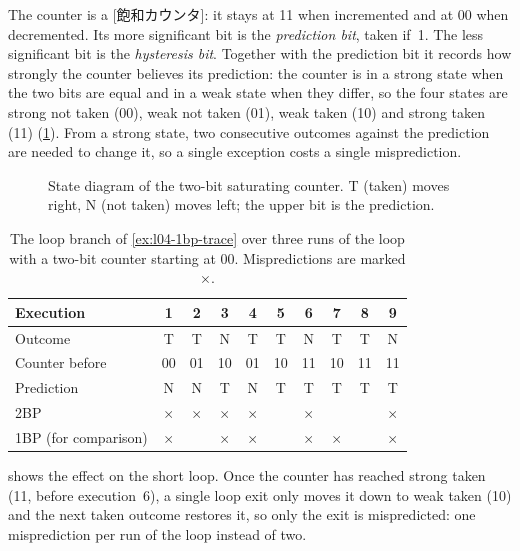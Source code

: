 \documentclass[../main.tex]{subfiles}
\begin{document}
The counter is a [飽和カウンタ]: it stays at 11 when
incremented and at 00 when decremented.  Its more significant bit is the
\emph{prediction bit}, taken if~1.  The less significant bit is the
\emph{hysteresis bit}.  Together with the prediction bit it records how
strongly the counter believes its prediction: the counter is in a strong
state when the two bits are equal and in a weak state when they differ, so
the four states are strong not taken (00), weak not taken (01), weak taken
(10) and strong taken (11) (\cref{fig:l04-2bc}).  From a
strong state, two consecutive outcomes against the prediction are needed to
change it, so a single exception costs a single misprediction.

\begin{figure}[htbp]
  \centering
  
  \caption{State diagram of the two-bit saturating counter.  T (taken)
    moves right, N (not taken) moves left; the upper bit is the prediction.}
  \label{fig:l04-2bc}
\end{figure}

\begin{table}[htbp]
  \centering\small
  \caption{The loop branch of \cref{ex:l04-1bp-trace} over three runs of the
    loop with a two-bit counter starting at 00.  Mispredictions are marked
    $\times$.}
  \label{tab:l04-2bc-trace}
  \setlength{\tabcolsep}{4.5pt}
  \begin{tabular}{@{}lccccccccc@{}}
    \toprule
    Execution       & 1 & 2 & 3 & 4 & 5 & 6 & 7 & 8 & 9 \\
    \midrule
    Outcome         & T & T & N & T & T & N & T & T & N \\
    Counter before  & 00 & 01 & 10 & 01 & 10 & 11 & 10 & 11 & 11 \\
    Prediction      & N & N & T & N & T & T & T & T & T \\
    2BP             & $\times$ & $\times$ & $\times$ & $\times$ & & $\times$ & & & $\times$ \\
    1BP (for comparison) & $\times$ & & $\times$ & $\times$ & & $\times$ & $\times$ & & $\times$ \\
    \bottomrule
  \end{tabular}
\end{table}

 shows the effect on the short loop.  Once the
counter has reached strong taken (11, before execution~6), a single loop
exit only moves it down to weak taken (10) and the next taken outcome
restores it, so only the exit is mispredicted: one misprediction per run of
the loop instead of two.
\end{document}
